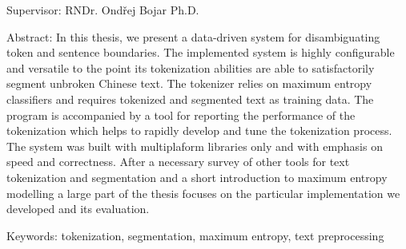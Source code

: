{\begin{singlespace}
Supervisor:
RNDr. Ondřej Bojar Ph.D.

Abstract:
In this thesis, we present a data-driven system for disambiguating token and
sentence boundaries. The implemented system is highly configurable and
versatile to the point its tokenization abilities are able to satisfactorily
segment unbroken Chinese text. The tokenizer relies on maximum entropy
classifiers and requires tokenized and segmented text as training data. The
program is accompanied by a tool for reporting the performance of the
tokenization which helps to rapidly develop and tune the tokenization process. The
system was built with multiplaform libraries only and with emphasis on speed
and correctness. After a necessary survey of other tools for text tokenization
and segmentation and a short introduction to maximum entropy modelling a large
part of the thesis focuses on the particular implementation we developed and
its evaluation.

Keywords:
tokenization, segmentation, maximum entropy, text preprocessing

\end{singlespace}

\vss}

\newpage
